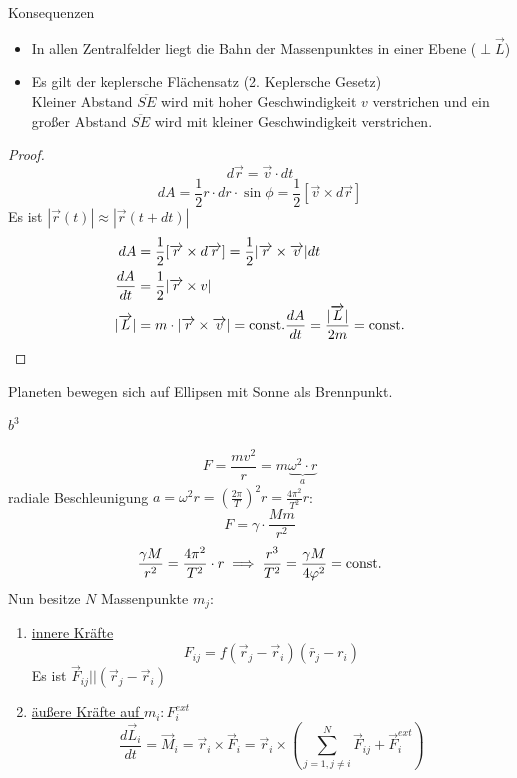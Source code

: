 \documentclass[a4paper,10pt]{scrartcl}
\begin{document}
\begin{seg}{Konsequenzen}
 \begin{itemize}
  \item In allen Zentralfelder liegt die Bahn der Massenpunktes in einer Ebene ($\perp \vec L$)
  \item Es gilt der keplersche Flächensatz (2. Keplersche Gesetz)\\
 Kleiner Abstand $\overline{SE}$ wird mit hoher Geschwindigkeit $v$ verstrichen und ein großer Abstand $\overline{SE}$ wird mit kleiner Geschwindigkeit verstrichen. 
 \end{itemize}
\end{seg}
\begin{proof}
\[
 d\vec r= \vec v \cdot dt
\]
\[
 dA=\frac{1}{2} r \cdot dr\cdot \sin \phi= \frac{1}{2}[\vec v \times d\vec r]
\]
Es ist $|\vec r(t)|\approx|\vec r(t+dt)|$
\begin{align*}
 dA&=\frac{1}{2}[\overrightarrow{r} \times d \overrightarrow{r}]= \frac{1}{2}|\overrightarrow{r} \times \overrightarrow{v}| dt\\
\frac{dA}{dt}&= \frac{1}{2}|\overrightarrow{r} \times v|\\
|\overrightarrow{L}|&= m\cdot |\overrightarrow{r} \times \overrightarrow{v}|=\text{const}.
\frac{dA}{dt}=\frac{|\overrightarrow{L}|}{2m}=\text{const}.
\end{align*}
\fixme[überprüfen]
\end{proof}
\begin{st}
 Planeten bewegen sich auf Ellipsen mit Sonne als Brennpunkt.
\end{st}
\begin{st}
  $b^3$
\end{st}
\[
 F=\frac{mv^2}{r}=m \underbrace{\omega^2\cdot r}_{a}
\]
radiale Beschleunigung $a= \omega^2 r= (\frac{2\pi}{T})^2r= \frac{4\pi^2}{T^2} r$:
\[
 F=\gamma \cdot \frac{Mm}{r^2}
\]
\[
 \frac{\gamma M}{r^2}= \frac{4\pi^2}{T^2} \cdot r \implies \frac{r^3}{T^2}=\frac{\gamma M}{4\varphi^2}=\text{const}.
\]
Nun besitze $N$ Massenpunkte $m_j$: 
\begin{enumerate}
 \item \underline{innere Kräfte}\\
        \[
         F_{ij}=f(\vec r_j- \vec r_i) (\bar r_j-r_i)
        \]
	Es ist $\vec F_{ij} || (\vec r_j-\vec r_i)$
\item \underline{äußere Kräfte auf $m_i: F_i^{ext}$}\\
\[
 \frac{d\vec L_i}{dt}=\vec M_i=\vec r_i\times \vec F_i= \vec r_i \times \left (\sum_{j=1, j\neq i}^N \vec F_{ij}+ \vec F_i^{ext}\right )
\]
\end{enumerate}
\end{document}
